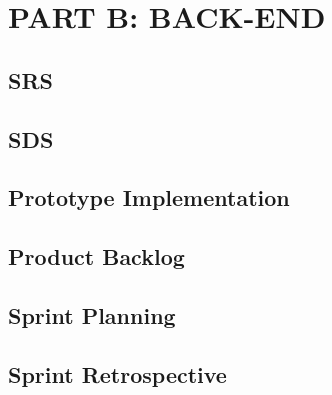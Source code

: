 \documentclass[12pt]{article}
\begin{document}
\newpage
\section{PART B: BACK-END}
\subsection{SRS}
\subsection{SDS}
\subsection{Prototype Implementation}
\subsection{Product Backlog}

\subsection{Sprint Planning}
\subsection{Sprint Retrospective}
\end{document}
